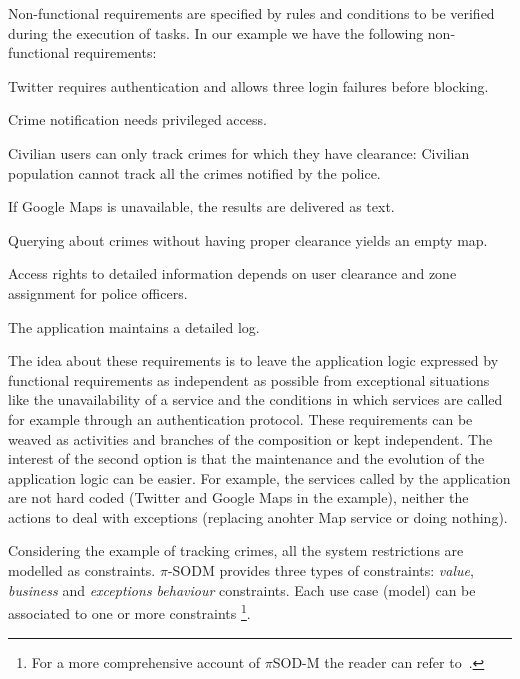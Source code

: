 Non-functional requirements are specified by rules and conditions to be verified during the execution of tasks.
In our example we have the following non-functional requirements:
\begin{numtrivlist}
\item Twitter requires authentication and allows three login failures before blocking. 
\item Crime notification needs privileged access.
\item Civilian users can only track crimes for which they have clearance: Civilian population cannot track all the crimes notified by the police. 
\item If \textsf{Google Maps} is unavailable, the results are delivered as text. 
\item Querying about crimes without having proper clearance yields an empty map.
\item Access rights to detailed information depends on user clearance and zone assignment for police officers. 
\item The application maintains a detailed log. 
\end{numtrivlist}
The idea about these requirements is to leave the application logic expressed by functional requirements as independent as possible from exceptional situations like the unavailability of a service and the conditions in which services are called for example through an authentication protocol. These requirements can be  weaved as activities and branches of the composition or kept independent. The interest of the second option is that the maintenance and the evolution of the application logic can be easier. For example, the services called by the application are not hard coded (Twitter and Google Maps in the example), neither the actions to deal with exceptions (replacing anohter Map service or doing nothing).

Considering the example of tracking crimes, all the system restrictions are
modelled as constraints. 
$\pi$-SODM provides three types of constraints:
\textit{value}, \textit{business} and \textit{exceptions behaviour} constraints.
Each use case (model) can be associated to one or more constraints \footnote{For a more comprehensive account of $\pi$SOD-M the reader can refer to~\cite{PlacidoThesis2012}.}.

